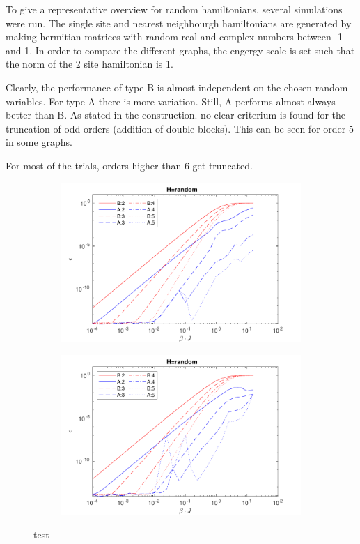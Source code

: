To give a representative overview for random hamiltonians, several simulations were run. The single site and nearest neighbourgh hamiltonians are generated by making hermitian matrices with random real and complex numbers between -1 and 1. In order to compare the different graphs, the engergy scale is set such that the norm of the 2 site hamiltonian is 1.


Clearly, the performance of type B is almost independent on the chosen random variables. For type A there is more variation. Still, A performs almost always better than B. As stated in the construction. no clear criterium is found for the truncation of odd orders (addition of double blocks). This can be seen for order 5  in some graphs.

For most of the trials, orders higher than 6 get truncated.

\begin{figure}[H]
    \begin{subfigure}[]{\textwidth}
        \includegraphics[width=\textwidth]{Figuren/benchmarking/rand_01.pdf}
    \end{subfigure}

    \medskip

    \begin{subfigure}[]{\textwidth}
        \includegraphics[width=\textwidth]{Figuren/benchmarking/rand_02.pdf}
    \end{subfigure}

    \caption{test }
\end{figure}

